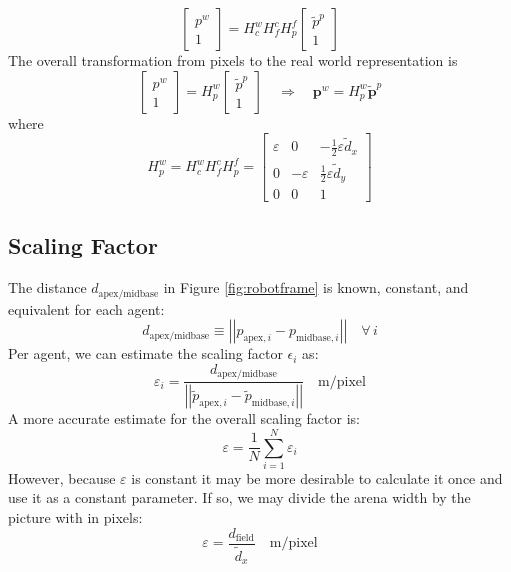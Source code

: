 \documentclass[12pt, a4paper]
{article}
\providecommand{\sub}[1]{_{\text{#1}}}
\providecommand{\subi}[1]{_{\text{#1},i}}
\providecommand{\twonorm}[1]{\left|\left|#1\right|\right|}
\providecommand{\foralli}{\quad \forall\, i}
\providecommand{\tp}{\tilde{p}}
\providecommand{\inert}{w}
\providecommand{\bp}{\boldsymbol{p}}
\providecommand{\btp}{\tilde{\bp}}
\begin{document}
\begin{equation}
\begin{bmatrix}
p^{\inert}\\
1
\end{bmatrix} = H^{\inert}_c H^c_f H^f_p \begin{bmatrix}
\tp^p\\1
\end{bmatrix}
\end{equation}
%
The overall transformation from pixels to the real world representation is
%
\begin{equation}
\begin{bmatrix}
p^{\inert}\\
1
\end{bmatrix} = H^{\inert}_p \begin{bmatrix}
\tp^p\\1
\end{bmatrix} \quad \Rightarrow \quad \bp^{\inert} = H^{\inert}_p 
\btp^p
\end{equation}
%
where
%
\begin{equation}
H^{\inert}_p =H^{\inert}_c H^c_f H^f_p = \begin{bmatrix}
 \varepsilon&    0& -\frac{1}{2}\varepsilon \tilde{d}_x\\
   0& -\varepsilon&  \frac{1}{2}\varepsilon \tilde{d}_y\\
0&    0&           1
\end{bmatrix}
\end{equation}



\subsection{Scaling Factor}
%
The distance $d\sub{apex/midbase}$ in Figure \ref{fig:robotframe} is known, constant, and equivalent for each agent:
%
\begin{equation}
d\sub{apex/midbase} \equiv \twonorm{p\subi{apex}-p\subi{midbase}} \foralli
\end{equation}
%
Per agent, we can estimate the scaling factor $\epsilon_i$ as:
%
\begin{equation}
\varepsilon_i = \dfrac{d\sub{apex/midbase}}{\twonorm{\tp\subi{apex}-\tp\subi{midbase}}} \quad \text{m/pixel}
\end{equation}
%
A more accurate estimate for the overall scaling factor is:
%
\begin{equation}
\varepsilon = \dfrac{1}{N}\sum^N_{i=1} \varepsilon_i
\end{equation}
%
However, because $\varepsilon$ is constant it may be more desirable to calculate it once and use it as a constant parameter. If so, we may divide the arena width by the picture with in pixels:
%
\begin{equation}
\varepsilon = \dfrac{d\sub{field}}{\tilde{d}_x} \quad \text{m/pixel}
\end{equation}
\pagebreak
\end{document}
